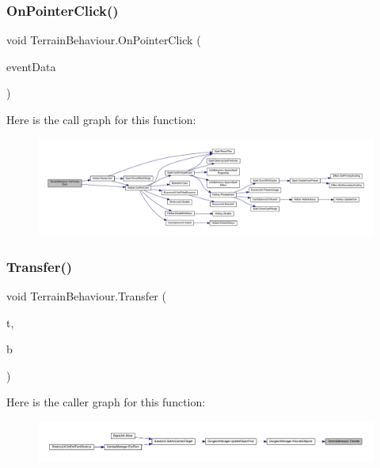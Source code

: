 \subsubsection{\texorpdfstring{OnPointerClick()}{OnPointerClick()}}
{\footnotesize\ttfamily void Terrain\+Behaviour.\+On\+Pointer\+Click (\begin{DoxyParamCaption}\item[{Pointer\+Event\+Data}]{event\+Data }\end{DoxyParamCaption})}

Here is the call graph for this function\+:
\nopagebreak
\begin{figure}[H]
\begin{center}
\leavevmode
\includegraphics[width=350pt]{class_terrain_behaviour_a81acf1d578876b7a0870fdb0880c52a9_cgraph}
\end{center}
\end{figure}
\mbox{\label{class_terrain_behaviour_a97b6323eafb1c26361878bb1d37f4556}} 
\subsubsection{\texorpdfstring{Transfer()}{Transfer()}}
{\footnotesize\ttfamily void Terrain\+Behaviour.\+Transfer (\begin{DoxyParamCaption}\item[{\mbox{\hyperlink{class_tile}{Tile}}}]{t,  }\item[{\mbox{\hyperlink{class_base_terrain}{Base\+Terrain}}}]{b }\end{DoxyParamCaption})}

Here is the caller graph for this function\+:
\nopagebreak
\begin{figure}[H]
\begin{center}
\leavevmode
\includegraphics[width=350pt]{class_terrain_behaviour_a97b6323eafb1c26361878bb1d37f4556_icgraph}
\end{center}
\end{figure}
\mbox{\label{class_terrain_behaviour_a1f1234296c90b45abf0ad3ee6f9e78ac}} 
